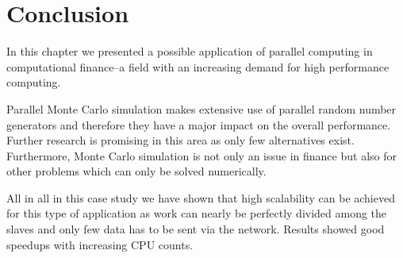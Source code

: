 

\section{Conclusion}

In this chapter we presented a possible application of parallel
computing in computational finance--a field with an increasing demand
for high performance computing.

Parallel Monte Carlo simulation makes extensive use of parallel random
number generators and therefore they have a major impact on the
overall performance. Further research is promising in this area
as only few alternatives exist. Furthermore, Monte Carlo simulation is
not only an issue in finance but also for other problems which can
only be solved numerically.

All in all in this case study we have shown that high scalability can
be achieved for this type of application as work can nearly be
perfectly divided among the slaves and only few 
data has to be sent via the network. Results showed good speedups
with increasing CPU counts.



